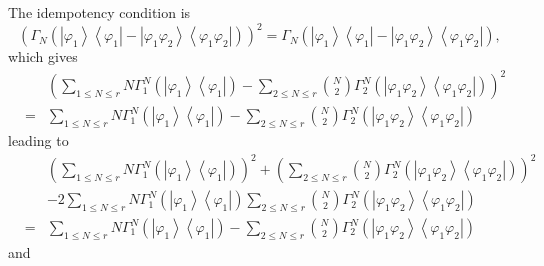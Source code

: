 \documentclass[12pt]{article}
\begin{document}
The idempotency condition is 
\begin{equation*}
\left( \Gamma _{N}\left( \left\vert \varphi _{1}\right\rangle \left\langle
\varphi _{1}\right\vert -\left\vert \varphi _{1}\varphi _{2}\right\rangle
\left\langle \varphi _{1}\varphi _{2}\right\vert \right) \right) ^{2}=\Gamma
_{N}\left( \left\vert \varphi _{1}\right\rangle \left\langle \varphi
_{1}\right\vert -\left\vert \varphi _{1}\varphi _{2}\right\rangle
\left\langle \varphi _{1}\varphi _{2}\right\vert \right) ,
\end{equation*}%
which gives 
\begin{eqnarray*}
&&\left( \sum_{1\leq N\leq r}N\Gamma _{1}^{N}\left( \left\vert \varphi
_{1}\right\rangle \left\langle \varphi _{1}\right\vert \right) -\sum_{2\leq
N\leq r}\binom{N}{2}\Gamma _{2}^{N}\left( \left\vert \varphi _{1}\varphi
_{2}\right\rangle \left\langle \varphi _{1}\varphi _{2}\right\vert \right)
\right) ^{2} \\
&=&\sum_{1\leq N\leq r}N\Gamma _{1}^{N}\left( \left\vert \varphi
_{1}\right\rangle \left\langle \varphi _{1}\right\vert \right) -\sum_{2\leq
N\leq r}\binom{N}{2}\Gamma _{2}^{N}\left( \left\vert \varphi _{1}\varphi
_{2}\right\rangle \left\langle \varphi _{1}\varphi _{2}\right\vert \right)
\end{eqnarray*}%
leading to 
\begin{eqnarray*}
&&\left( \sum_{1\leq N\leq r}N\Gamma _{1}^{N}\left( \left\vert \varphi
_{1}\right\rangle \left\langle \varphi _{1}\right\vert \right) \right)
^{2}+\left( \sum_{2\leq N\leq r}\binom{N}{2}\Gamma _{2}^{N}\left( \left\vert
\varphi _{1}\varphi _{2}\right\rangle \left\langle \varphi _{1}\varphi
_{2}\right\vert \right) \right) ^{2} \\
&&-2\sum_{1\leq N\leq r}N\Gamma _{1}^{N}\left( \left\vert \varphi
_{1}\right\rangle \left\langle \varphi _{1}\right\vert \right) \sum_{2\leq
N\leq r}\binom{N}{2}\Gamma _{2}^{N}\left( \left\vert \varphi _{1}\varphi
_{2}\right\rangle \left\langle \varphi _{1}\varphi _{2}\right\vert \right) \\
&=&\sum_{1\leq N\leq r}N\Gamma _{1}^{N}\left( \left\vert \varphi
_{1}\right\rangle \left\langle \varphi _{1}\right\vert \right) -\sum_{2\leq
N\leq r}\binom{N}{2}\Gamma _{2}^{N}\left( \left\vert \varphi _{1}\varphi
_{2}\right\rangle \left\langle \varphi _{1}\varphi _{2}\right\vert \right)
\end{eqnarray*}%
and 
\end{document}
